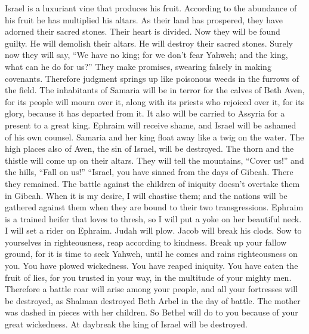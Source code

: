 \begin{paracol}{2}
\begin{otherlanguage}{english}
 Israel is a luxuriant vine that produces his fruit.
According to the abundance of his fruit he has multiplied his altars. As
their land has prospered, they have adorned their sacred stones.
 Their heart is divided. Now they will be found guilty. He
will demolish their altars. He will destroy their sacred stones.
 Surely now they will say, ``We have no king; for we don't
fear Yahweh; and the king, what can he do for us?''  They
make promises, swearing falsely in making covenants. Therefore judgment
springs up like poisonous weeds in the furrows of the field.
 The inhabitants of Samaria will be in terror for the
calves of Beth Aven, for its people will mourn over it, along with its
priests who rejoiced over it, for its glory, because it has departed
from it.  It also will be carried to Assyria for a present
to a great king. Ephraim will receive shame, and Israel will be ashamed
of his own counsel.  Samaria and her king float away like
a twig on the water.  The high places also of Aven, the
sin of Israel, will be destroyed. The thorn and the thistle will come up
on their altars. They will tell the mountains, ``Cover us!'' and the
hills, ``Fall on us!''  ``Israel, you have sinned from the
days of Gibeah. There they remained. The battle against the children of
iniquity doesn't overtake them in Gibeah.  When it is my
desire, I will chastise them; and the nations will be gathered against
them when they are bound to their two transgressions. 
Ephraim is a trained heifer that loves to thresh, so I will put a yoke
on her beautiful neck. I will set a rider on Ephraim. Judah will plow.
Jacob will break his clods.  Sow to yourselves in
righteousness, reap according to kindness. Break up your fallow ground,
for it is time to seek Yahweh, until he comes and rains righteousness on
you.  You have plowed wickedness. You have reaped
iniquity. You have eaten the fruit of lies, for you trusted in your way,
in the multitude of your mighty men.  Therefore a battle
roar will arise among your people, and all your fortresses will be
destroyed, as Shalman destroyed Beth Arbel in the day of battle. The
mother was dashed in pieces with her children.  So Bethel
will do to you because of your great wickedness. At daybreak the king of
Israel will be destroyed.

\end{otherlanguage}


\end{paracol}
